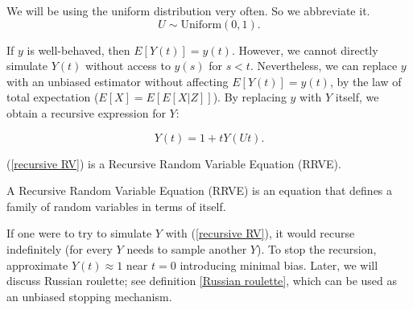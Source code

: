 \documentclass[a4paper,12pt]{article}
\begin{document}
\begin{notation}[$U$]
    We will be using the uniform distribution very often. So
    we abbreviate it.
    \begin{equation}
        U \sim \text{Uniform}(0,1).
    \end{equation}
\end{notation}

If $y$ is well-behaved, then $E[Y(t)] = y(t)$.
However, we cannot directly simulate $Y(t)$ without access
to $y(s)$ for $s < t$. Nevertheless, we can replace $y$ with
an unbiased estimator without affecting $E[Y(t)] = y(t)$,
by the law of total expectation ($E[X] = E[E[X|Z]]$).
By replacing $y$ with $Y$ itself, we obtain a recursive
expression for $Y$:

\begin{equation} \label{recursive RV}
    Y(t) = 1 + t  Y(Ut).
\end{equation}

(\ref{recursive RV}) is a Recursive Random Variable
Equation (RRVE).

\begin{definition}
    A Recursive Random Variable Equation (RRVE) is
    an equation that defines a
    family of random variables in terms of itself.
\end{definition}

If one were to try to simulate $Y$ with (\ref{recursive RV}),
it would recurse indefinitely (for every $Y$ needs to sample another $Y$).
To stop the recursion, approximate
$Y(t) \approx 1$ near $t = 0$ introducing minimal bias.
Later, we will discuss Russian roulette; see definition \ref{Russian roulette},
which can be used as an unbiased stopping mechanism.

\vspace*{0.2cm}
\end{document}
